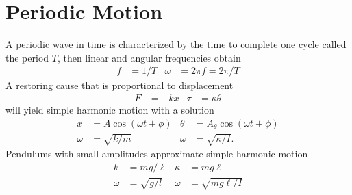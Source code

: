 \section{Periodic Motion}

A periodic wave in time is characterized by the time to complete one
cycle called the period $T$, then linear and angular frequencies obtain
\begin{align*}
  f &= 1/T  & \omega &= 2\pi f = 2\pi/T
\end{align*}
A restoring cause that is proportional to displacement
\begin{align*}
  F &= -kx  & \tau &= \kappa \theta
\end{align*}
will yield simple harmonic motion with a solution
\begin{align*}
  x &= A \cos(\omega t + \phi)  &  \theta &= A_{\theta} \cos(\omega t +
  \phi)\\
  \omega &= \sqrt{k/m}  & \omega &= \sqrt{\kappa/I}. 
\end{align*}
Pendulums with small amplitudes approximate simple harmonic motion
\begin{align*}
  k &= mg/\ell  & \kappa &= mg\ell\\
  \omega &= \sqrt{g/l}  & \omega &= \sqrt{mg\ell/I}
\end{align*}

